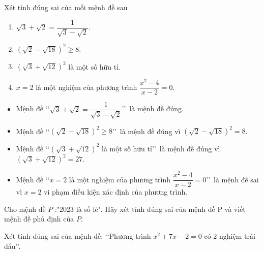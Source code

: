 \begin{bt}%
	Xét tính đúng sai của mỗi mệnh đề sau
	\begin{enumerate}
		\item $\sqrt{3}+\sqrt{2}=\dfrac{1}{\sqrt{3}-\sqrt{2}}$.
		\item $\left(\sqrt{2}-\sqrt{18}\right)^2\geqslant8$.
		\item $\left(\sqrt{3}+\sqrt{12}\right)^2$ là một số hữu tỉ.
		\item $x=2$ là một nghiệm của phương trình $\dfrac{x^2-4}{x-2}=0$.
	\end{enumerate}
	\loigiai
	{
		\begin{itemize}
			\item Mệnh đề \lq\lq $\sqrt{3}+\sqrt{2}=\dfrac{1}{\sqrt{3}-\sqrt{2}}$\rq\rq\ là mệnh đề đúng.
			\item Mệnh đề \lq\lq $\left(\sqrt{2}-\sqrt{18}\right)^2\geqslant8$\rq\rq\ là mệnh đề đúng vì $\left(\sqrt{2}-\sqrt{18}\right)^2=8$.
			\item Mệnh đề \lq\lq $\left(\sqrt{3}+\sqrt{12}\right)^2$ là một số hữu tỉ\rq\rq\ là mệnh đề đúng vì $\left(\sqrt{3}+\sqrt{12}\right)^2=27$.
			\item Mệnh đề \lq\lq $x=2$ là một nghiệm của phương trình $\dfrac{x^2-4}{x-2}=0$\rq\rq\ là mệnh đề sai vì $x=2$ vi phạm điều kiện xác định của phương trình.
		\end{itemize}
	}
\end{bt}

\begin{bt}%
	Cho mệnh đề $P$ :"2023 là số lẻ". Hãy xét tính đúng sai của mệnh đề $\mathrm{P}$ và viết mệnh đề phủ định của $P$.
\end{bt}

\begin{bt}%
	Xét tính đúng sai của mệnh đề: \lq\lq Phương trình $x^2+7x-2=0$ có $2$ nghiệm trái dấu\rq\rq.
\end{bt}


